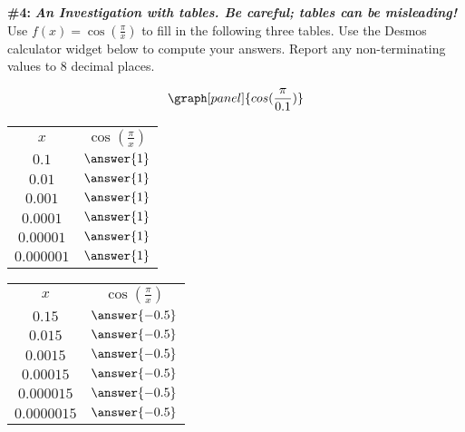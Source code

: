 \documentclass[handout,nooutcomes]{ximera}
\begin{document}
\begin{problem}{\textbf{\#4: }}{\textbf{\textit{An Investigation with tables. Be careful; tables can be misleading! }}}
Use $\displaystyle f(x)=\cos\left(\frac{\pi}{x}\right)$ to fill in the following three tables.
Use the Desmos calculator widget below to compute your answers. Report any non-terminating values to 8 decimal places.

\[
\graph[panel]{cos(\frac{\pi}{0.1})}
\]

\begin{tabular}{|c|c|}

\hline
		$x$ & $\cos\left(\frac{\pi}{x}\right)$\\
		
        $0.1$ & $\answer{1}$\\
		
		$0.01$ & $\answer{1}$\\
		
		$0.001$ & $\answer{1}$\\
		
		$0.0001$ & $\answer{1}$\\
		
		$0.00001$ & $\answer{1}$ \\
		
		$0.000001$ & $\answer{1}$ \\

		
\end{tabular}

\bigskip
\bigskip

\begin{tabular}{|c|c|}

\hline
		$x$ & $\cos\left(\frac{\pi}{x}\right)$\\
		
        $0.15$ & $\answer{-0.5}$\\
		
		$0.015$ & $\answer{-0.5}$\\
		
		$0.0015$ & $\answer{-0.5}$\\
		
		$0.00015$ & $\answer{-0.5}$\\
		
		$0.000015$ & $\answer{-0.5}$ \\
		
		$0.0000015$ & $\answer{-0.5}$ \\

		
\end{tabular}


\end{problem}
\end{document}
